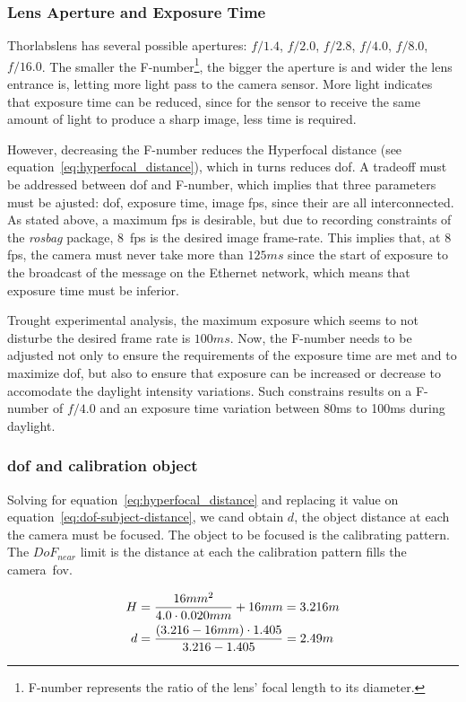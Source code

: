 \subsubsection{Lens Aperture and Exposure Time}
Thorlabs\cp lens has several possible apertures: $f/1.4$, $f/2.0$, $f/2.8$, $f/4.0$, $f/8.0$, $f/16.0$. The smaller the F-number\footnote{F-number represents the ratio of the lens' focal length to its diameter.}, the bigger the aperture is and wider the lens entrance is, letting more light pass to the camera sensor. More light indicates that exposure time can be reduced, since for the sensor to receive the same amount of light to produce a sharp image, less time is required.

However, decreasing the F-number reduces the Hyperfocal distance (see equation~\ref{eq:hyperfocal_distance}), which in turns reduces \acf{dof}. A tradeoff must be addressed between \ac{dof} and F-number, which implies that three parameters must be ajusted: \ac{dof}, exposure time, image \ac{fps}, since their are all interconnected. As stated above, a maximum \ac{fps} is desirable, but due to recording constraints of the \emph{rosbag} package, $8$~\ac{fps} is the desired image frame-rate. This implies that, at $8$\ac{fps}, the camera must never take more than $125ms$ since the start of exposure to the broadcast of the message on the Ethernet network, which means that exposure time must be inferior. 

Trought experimental analysis, the maximum exposure which seems to not disturbe the desired frame rate is $100ms$. Now, the F-number needs to be adjusted not only to ensure the requirements of the exposure time are met and to maximize \acl{dof}, but also to ensure that exposure can be increased or decrease to accomodate the daylight intensity variations. Such constrains results on a F-number of $f/4.0$ and an exposure time variation between 80ms to 100ms during daylight.

\subsubsection{\acl{dof} and calibration object}
Solving for equation~\ref{eq:hyperfocal_distance} and replacing it value on equation~\ref{eq:dof-subject-distance}, we cand obtain $d$, the object distance at each the camera must be focused. The object to be focused is the calibrating pattern. The $DoF_{near}$ limit is the distance at each the calibration pattern fills the camera~\ac{fov}.

\begin{subequations}
	\begin{align}
		H & = \frac{16mm^2}{4.0 \cdot 0.020mm} + 16mm  = 3.216 m \label{eq:hyperfocal-distance-value} \\
		\vspace{25mm}
		d & = \frac{(3.216 - 16mm) \cdot 1.405}{3.216 - 1.405} = 2.49m \label{eq:dof-subject-distance-value}
	\end{align}
\end{subequations}


